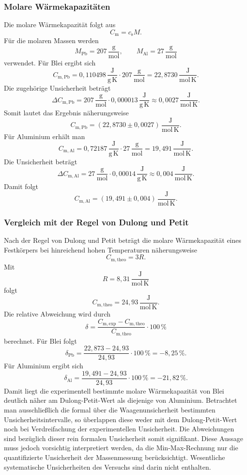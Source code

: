 \documentclass{report}
\begin{document}
\subsubsection{Molare Wärmekapazitäten}
\noindent
Die molare Wärmekapazität folgt aus
\[
C_\mathrm{m}=c_\mathrm{s}M.
\]
\noindent
Für die molaren Massen werden
\[
M_\mathrm{Pb}=207\,\frac{\mathrm{g}}{\mathrm{mol}},
\qquad
M_\mathrm{Al}=27\,\frac{\mathrm{g}}{\mathrm{mol}}
\]
verwendet.
\noindent
Für Blei ergibt sich
\[
C_{\mathrm{m,Pb}}
=
0{,}110498\,\frac{\mathrm{J}}{\mathrm{g\,K}}
\cdot
207\,\frac{\mathrm{g}}{\mathrm{mol}}
=
22{,}8730\,\frac{\mathrm{J}}{\mathrm{mol\,K}}.
\]
\noindent
Die zugehörige Unsicherheit beträgt
\[
\Delta C_{\mathrm{m,Pb}}
=
207\,\frac{\mathrm{g}}{\mathrm{mol}}
\cdot
0{,}000013\,\frac{\mathrm{J}}{\mathrm{g\,K}}
\approx
0{,}0027\,\frac{\mathrm{J}}{\mathrm{mol\,K}}.
\]
\noindent
Somit lautet das Ergebnis näherungsweise
\[
\boxed{
C_{\mathrm{m,Pb}}
=
(22{,}8730\pm0{,}0027)
\,\frac{\mathrm{J}}{\mathrm{mol\,K}}
}.
\]
\noindent
Für Aluminium erhält man
\[
C_{\mathrm{m,Al}}
=
0{,}72187\,\frac{\mathrm{J}}{\mathrm{g\,K}}
\cdot
27\,\frac{\mathrm{g}}{\mathrm{mol}}
=
19{,}491\,\frac{\mathrm{J}}{\mathrm{mol\,K}}.
\]
\noindent
Die Unsicherheit beträgt
\[
\Delta C_{\mathrm{m,Al}}
=
27\,\frac{\mathrm{g}}{\mathrm{mol}}
\cdot
0{,}00014\,\frac{\mathrm{J}}{\mathrm{g\,K}}
\approx
0{,}004\,\frac{\mathrm{J}}{\mathrm{mol\,K}}.
\]
\noindent
Damit folgt
\[
\boxed{
C_{\mathrm{m,Al}}
=
(19{,}491\pm0{,}004)
\,\frac{\mathrm{J}}{\mathrm{mol\,K}}
}.
\]


\subsubsection{Vergleich mit der Regel von Dulong und Petit}
\noindent
Nach der Regel von Dulong und Petit beträgt die molare Wärmekapazität eines
Festkörpers bei hinreichend hohen Temperaturen näherungsweise
\[
C_{\mathrm{m,theo}}=3R.
\]
\noindent
Mit
\[
R=8{,}31\,\frac{\mathrm{J}}{\mathrm{mol\,K}}
\]
\noindent
folgt
\[
\boxed{
C_{\mathrm{m,theo}}
=
24{,}93\,\frac{\mathrm{J}}{\mathrm{mol\,K}}
}.
\]
\noindent
Die relative Abweichung wird durch
\[
\delta
=
\frac{
C_{\mathrm{m,exp}}-C_{\mathrm{m,theo}}
}{
C_{\mathrm{m,theo}}
}
\cdot100\,\%
\]
\noindent
berechnet.
\noindent
Für Blei folgt
\[
\delta_\mathrm{Pb}
=
\frac{22{,}873-24{,}93}{24{,}93}\cdot100\,\%
=
-8{,}25\,\%.
\]
\noindent
Für Aluminium ergibt sich
\[
\delta_\mathrm{Al}
=
\frac{19{,}491-24{,}93}{24{,}93}\cdot100\,\%
=
-21{,}82\,\%.
\]
\noindent
Damit liegt die experimentell bestimmte molare Wärmekapazität von Blei
deutlich näher am Dulong-Petit-Wert als diejenige von Aluminium.
\noindent
Betrachtet man ausschließlich die formal über die Waagenunsicherheit
bestimmten Unsicherheitsintervalle, so überlappen diese weder mit dem
Dulong-Petit-Wert noch bei Verdreifachung der experimentellen Unsicherheit.
Die Abweichungen sind bezüglich dieser rein formalen Unsicherheit somit
signifikant.
\noindent
Diese Aussage muss jedoch vorsichtig interpretiert werden, da die
Min-Max-Rechnung nur die quantifizierte Unsicherheit der Massenmessung
berücksichtigt. Wesentliche systematische Unsicherheiten des Versuchs sind
darin nicht enthalten.
\end{document}
